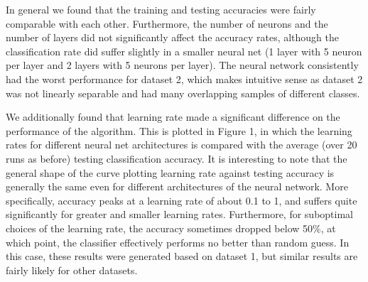 \documentclass{article}
\begin{document}
In general we found that the training and testing accuracies were fairly comparable with each other. Furthermore, the number of neurons and the number of layers did not significantly affect the accuracy rates, although the classification rate did suffer slightly in a smaller neural net (1 layer with 5 neuron per layer and 2 layers with 5 neurons per layer). The neural network consistently had the worst performance for dataset 2, which makes intuitive sense as dataset 2 was not linearly separable and had many overlapping samples of different classes.

We additionally found that learning rate made a significant difference on the performance of the algorithm. This is plotted in Figure 1, in which the learning rates for different neural net architectures is compared with the average (over 20 runs as before) testing classification accuracy. It is interesting to note that the general shape of the curve plotting learning rate against testing accuracy is generally the same even for different architectures of the neural network. More specifically, accuracy peaks at a learning rate of about 0.1 to 1, and suffers quite significantly for greater and smaller learning rates. Furthermore, for suboptimal choices of the learning rate, the accuracy sometimes dropped below 50\%, at which point, the classifier effectively performs no better than random guess. In this case, these results were generated based on dataset 1, but similar results are fairly likely for other datasets.
\end{document}
